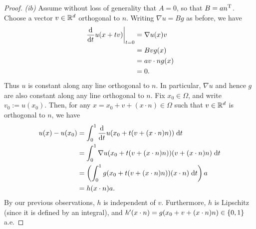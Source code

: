 \begin{proof}
    \textit{(ib)} Assume without loss of generality that $A = 0$, so that $B = an^{\mathrm{T}}$. Choose a vector $v \in \mathbb{R}^d$ orthogonal to $n$.  Writing $\nabla u = B g$ as before, we have
    \begin{equation} \begin{aligned}
        \left. \frac{\mathrm{d}^{}}{\mathrm{d}{t}^{}} u(x + tv) \right\vert_{t=0} 
        &= \nabla u(x) v \\
        &= Bv g(x) \\
        &= a v \cdot n g(x) \\
        &= 0.
    \end{aligned} \end{equation}
    Thus $u$ is constant along any line orthogonal to $n$. In particular, $\nabla u$ and hence $g$ are also constant along any line orthogonal to $n$. Fix $x_0 \in \Omega$, and write $v_0 := u(x_0)$. Then, for any $x = x_0 + v + (x \cdot n) \in \Omega$ such that $v \in \mathbb{R}^d$ is orthogonal to $n$, we have 
    \begin{equation} \begin{aligned}
        u(x) - u(x_0)
        &= \int_0^1 \frac{\mathrm{d}^{}}{\mathrm{d}{t}^{}} u(x_0 + t(v + (x \cdot n)n)) \; \mathrm{d}{t} \\
        &= \int_0^1 \nabla u(x_0 + t(v + (x \cdot n)n))(v + (x \cdot n)n) \; \mathrm{d}{t} \\
        &= \left( { \int_0^1 g(x_0 + t(v + (x \cdot n)n)) (x \cdot n) \; \mathrm{d}{t} } \right) a \\
        &= h(x \cdot n) a.
    \end{aligned} \end{equation}
    By our previous observations, $h$ is independent of $v$. Furthermore, $h$ is Lipschitz (since it is defined by an integral), and $h'(x \cdot n) = g(x_0 + v + (x \cdot n)n) \in \left\{ {0,1} \right\}$ a.e.


\end{proof}
